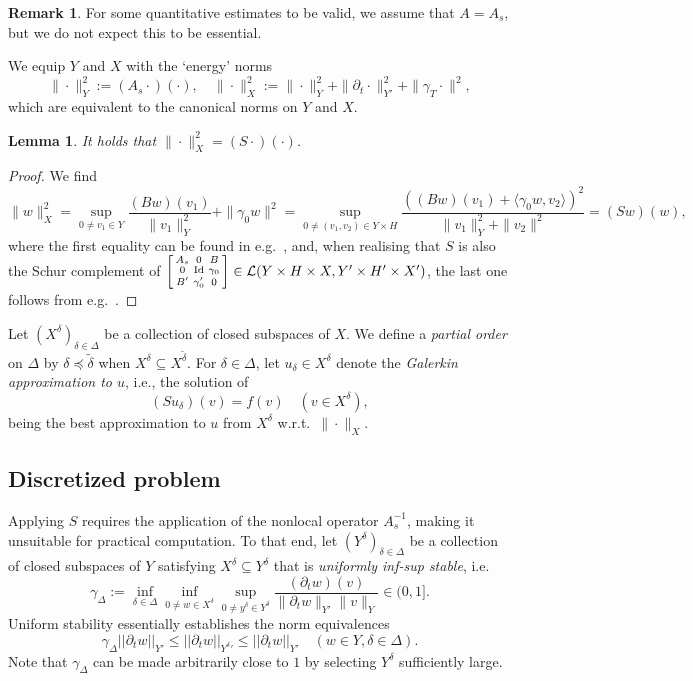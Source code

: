 \documentclass[11pt,a4paper,oneside,english]{amsart}
\numberwithin{equation}{section}
\numberwithin{theorem}{section}
\newtheorem{lemma}[theorem]{Lemma}
\theoremstyle{definition}
\newtheorem{remark}[theorem]{Remark}
\newcommand{\la}{\langle}
\newcommand{\ra}{\rangle}
\DeclareMathOperator*{\Id}{Id}
\newcommand{\cL}{\mathcal L}
\newcommand{\jw}[1]{{\color{red}{JW: #1}}}
\begin{document}
\begin{remark}
  For some quantitative estimates to be valid, we assume that $A=A_s$, but we do not expect this to be essential.
\end{remark}
We equip $Y$ and $X$ with the `energy' norms
$$
\|\cdot\|_Y^2:=(A_s\cdot)(\cdot),\quad \|\cdot\|_X^2:=\|\cdot\|_Y^2+\|\partial_t \cdot\|_{Y'}^2+\|\gamma_T \cdot\|^2,
$$
which are equivalent to the canonical norms on $Y$ and $X$.

\begin{lemma}
  \label{lem:energy-norm}
  It holds that $\|\cdot\|_X^2=(S\cdot)(\cdot)$.
\end{lemma}
\begin{proof} 
  We find \jw{dit ben ik nog niet nagegaan}
  \[
    \|w\|_X^2=\sup_{0 \neq v_1 \in Y} \frac{(B w)(v_1)}{\|v_1\|_Y^2}+\|\gamma_0 w\|^2
    =\sup_{0 \neq (v_1,v_2) \in Y \times H} \frac{((B w)(v_1)+\la \gamma_0 w,v_2\ra)^2}{\|v_1\|_Y^2+\|v_2\|^2} =(Sw)(w),
  \]
  where the first equality can be found in e.g.~\cite[Thm.~2.1]{Ern2017a}, and,
  when realising that $S$ is also the Schur complement of 
  $\begin{bsmallmatrix} A_s & 0 & B\\ 0 & \Id & \gamma_0\\ B' & \gamma_0' & 0\end{bsmallmatrix} \in \cL(Y\times H \times X, Y'\times H'\times X')$, the last one follows from e.g.~\cite[Lemma~2.2]{Kondratyuk2008}.
\end{proof}

Let $(X^\delta)_{\delta \in \Delta}$ be a collection of closed subspaces of $X$. 
We define a \emph{partial order} on $\Delta$ by $\delta \preceq \tilde{\delta}$
when $X^\delta \subseteq X^{\tilde{\delta}}$. For $\delta \in \Delta$, let
$u_\delta \in X^\delta$ denote the {\em Galerkin approximation to $u$}, i.e., the solution of
\begin{equation}
(Su_\delta)(v)=f(v) \quad (v \in X^\delta), 
  \label{eqn:galerkin}
\end{equation}
being the best approximation to $u$ from $X^\delta$ w.r.t.~$\|\cdot\|_X$.

\subsection{Discretized problem}
Applying $S$ requires the application of the nonlocal operator $A_s^{-1}$, making it
unsuitable for practical computation. To that end, let $(Y^\delta)_{\delta \in \Delta}$
be a collection of closed subspaces of $Y$ satisfying $X^\delta \subseteq Y^\delta$
that is \emph{uniformly inf-sup stable}, i.e.
\begin{equation}
  \gamma_\Delta:=\inf_{\delta \in \Delta}\inf_{0 \neq w \in X^\delta}\sup_{0\neq y^\delta \in Y^\delta} \frac{(\partial_t w)(v)}{\|\partial_t w\|_{Y'}\|v\|_Y} \in (0,1].
  \label{eqn:infinfsup}
\end{equation}
Uniform stability essentially establishes the norm equivalences
\[
  \gamma_\Delta ||\partial_t w||_{Y'} \leq ||\partial_t w||_{{Y^\delta}'} \leq ||\partial_t w||_{Y'} \quad (w \in Y, \delta \in \Delta).
\]
Note that $\gamma_\Delta$ can be made arbitrarily close to $1$ by selecting $Y^\delta$ sufficiently large.
\end{document}
